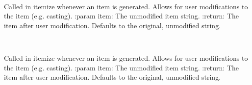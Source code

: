 \documentclass[letterpaper,10pt,english,openany,oneside]{sphinxmanual}
\begin{document}
\begin{fulllineitems}
\label{\detokenize{api:spookyconsole.ntutils.BooleanArrayParamType}}~

\begin{fulllineitems}
\label{\detokenize{api:spookyconsole.ntutils.BooleanArrayParamType.item_hook}}
Called in itemize whenever an item is generated. Allows for user modifications to the item (e.g. casting).
:param item: The unmodified item string.
:return: The item after user modification. Defaults to the original, unmodified string.

\end{fulllineitems}


\end{fulllineitems}


\begin{fulllineitems}
\label{\detokenize{api:spookyconsole.ntutils.DoubleArrayParamType}}~

\begin{fulllineitems}
\label{\detokenize{api:spookyconsole.ntutils.DoubleArrayParamType.item_hook}}
Called in itemize whenever an item is generated. Allows for user modifications to the item (e.g. casting).
:param item: The unmodified item string.
:return: The item after user modification. Defaults to the original, unmodified string.

\end{fulllineitems}


\end{fulllineitems}

\end{document}
